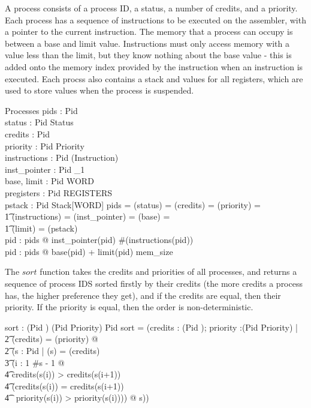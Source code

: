 \documentclass{article}
\begin{document}
A process consists of a process ID, a status, a number of credits, and
a priority. Each process has a sequence of instructions to be executed
on the assembler, with a pointer to the current instruction. The
memory that a process can occupy is between a base and limit
value. Instructions must only access memory with a value less than the
limit, but they know nothing about the base value - this is added onto
the memory index provided by the instruction when an instruction is
executed. Each procss also contains a stack and values for all
registers, which are used to store values when the process is
suspended.

\begin{schema}{Processes}
  pids : \power Pid\\
  status : Pid \pfun Status\\
  credits : Pid \pfun \nat\\
  priority : Pid \pfun Priority\\
  instructions : Pid \pfun (\seq Instruction)\\
  inst\_pointer : Pid \pfun \nat_1\\
  base, limit : Pid \pfun WORD\\
  pregisters : Pid \pfun REGISTERS\\
  pstack : Pid \pfun Stack[WORD]
\where
  pids = \dom(status) = \dom(credits) = \dom(priority) =\\
    \t1 \dom(instructions) = \dom(inst\_pointer) = \dom(base) =\\
    \t1 \dom(limit) = \dom(pstack)\\
  \forall pid : pids @ inst\_pointer(pid) \leq \#(instructions(pid))\\
  \forall pid : pids @ base(pid) + limit(pid) \leq mem\_size
\end{schema}

The $sort$ function takes the credits and priorities of all processes,
and returns a sequence of process IDS sorted firstly by their credits
(the more credits a process has, the higher preference they get), and
if the credits are equal, then their priority. If the priority is
equal, then the order is non-deterministic.

\begin{axdef}
  sort : (Pid \pfun \nat) \cross (Pid \pfun Priority) \pfun \iseq Pid
\where
  sort =
    (\lambda credits : (Pid \pfun \nat); priority :(Pid \pfun Priority) |\\
    \t2 \dom(credits) = \dom(priority) @\\
    \t2 (\mu s : \iseq Pid | \ran(s) = \dom(credits) \land\\
      \t3 (\forall i : 1 \upto \#s - 1 @\\
        \t4 credits(s(i)) > credits(s(i+1)) \lor\\
        \t4 (credits(s(i)) = credits(s(i+1)) \land\\
        \t4 \ priority(s(i)) > priority(s(i)))) @ s))
\end{axdef}
\end{document}

